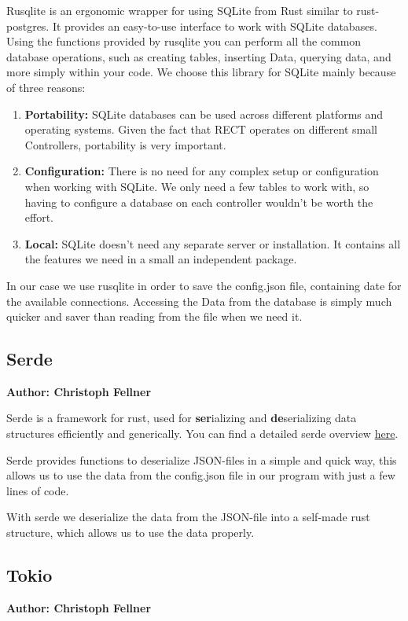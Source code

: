 Rusqlite is an ergonomic wrapper for using SQLite from Rust similar to rust-postgres. It provides an easy-to-use interface to work with SQLite databases. Using the functions provided by rusqlite you can perform all the common database operations, such as creating tables, inserting Data, querying data, and more simply within your code. 
We choose this library for SQLite mainly because of three reasons:
\begin{enumerate}
    \item \textbf{Portability:} SQLite databases can be used across different platforms and operating systems. Given the fact that RECT operates on different small Controllers, portability is very important.
    \item \textbf{Configuration:} There is no need for any complex setup or configuration when working with SQLite. We only need a few tables to work with, so having to configure a database on each controller wouldn't be worth the effort.
    \item \textbf{Local:} SQLite doesn't need any separate server or installation. It contains all the features we need in a small an independent package.
\end{enumerate}

In our case we use rusqlite in order to save the config.json file, containing date for the available connections. Accessing the Data from the database is simply much quicker and saver than reading from the file when we need it. 

\subsection{Serde}
\textbf{Author: Christoph Fellner}

Serde is a framework for rust, used for \textbf{ser}ializing and \textbf{de}serializing data structures efficiently and generically. You can find a detailed serde overview \href{https://serde.rs/}{here}.

Serde provides functions to deserialize JSON-files in a simple and quick way, this allows us to use the data from the config.json file in our program with just a few lines of code.

With serde we deserialize the data from the JSON-file into a self-made rust structure, which allows us to use the data properly.  

\subsection{Tokio}
\textbf{Author: Christoph Fellner}

